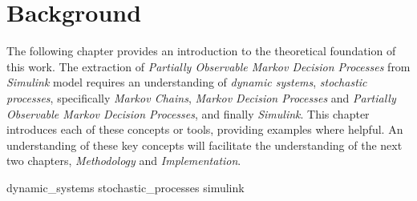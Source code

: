 \chapter{Background}

The following chapter provides an introduction to the theoretical foundation of this work. The extraction of \textit{Partially Observable Markov Decision Processes} from \textit{Simulink} model requires an understanding of \textit{dynamic systems}, \textit{stochastic processes}, specifically \textit{Markov Chains}, \textit{Markov Decision Processes} and \textit{Partially Observable Markov Decision Processes}, and finally \textit{Simulink}. This chapter introduces each of these concepts or tools, providing examples where helpful. An understanding of these key concepts will facilitate the understanding of the next two chapters, \textit{Methodology} and \textit{Implementation}.

{dynamic_systems}
{stochastic_processes}
{simulink}            
